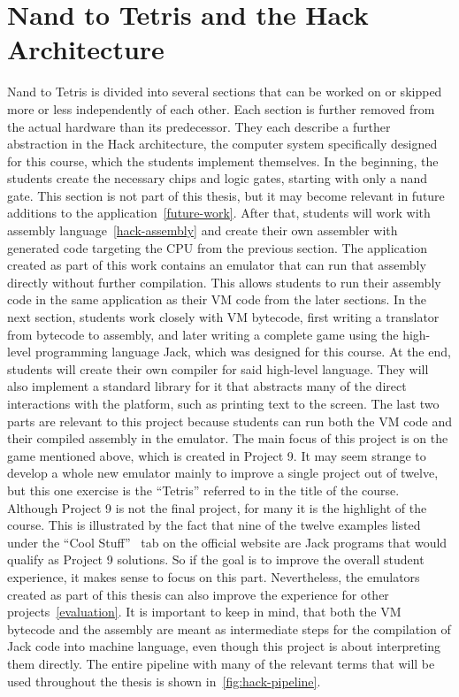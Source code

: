 \section{Nand to Tetris and the Hack Architecture} \label{hack-architecture}
Nand to Tetris is divided into several sections that can be worked on or skipped more or less independently of each other.
Each section is further removed from the actual hardware than its predecessor.
They each describe a further abstraction in the Hack architecture, the computer system specifically designed for this course, which the students implement themselves.
In the beginning, the students create the necessary chips and logic gates, starting with only a nand gate.
This section is not part of this thesis, but it may become relevant in future additions to the application~\ref{future-work}.
After that, students will work with assembly language~\ref{hack-assembly} and create their own assembler with generated code targeting the CPU from the previous section.
The application created as part of this work contains an emulator that can run that assembly directly without further compilation.
This allows students to run their assembly code in the same application as their VM code from the later sections.
In the next section, students work closely with VM bytecode, first writing a translator from bytecode to assembly, and later writing a complete game using the high-level programming language Jack, which was designed for this course.
At the end, students will create their own compiler for said high-level language.
They will also implement a standard library for it that abstracts many of the direct interactions with the platform, such as printing text to the screen.
The last two parts are relevant to this project because students can run both the VM code and their compiled assembly in the emulator.
The main focus of this project is on the game mentioned above, which is created in Project 9.
It may seem strange to develop a whole new emulator mainly to improve a single project out of twelve, but this one exercise is the ``Tetris'' referred to in the title of the course.
Although Project 9 is not the final project, for many it is the highlight of the course.
This is illustrated by the fact that nine of the twelve examples listed under the ``Cool Stuff''~\cite{n2tweb} tab on the official website are Jack programs that would qualify as Project 9 solutions.
So if the goal is to improve the overall student experience, it makes sense to focus on this part.
Nevertheless, the emulators created as part of this thesis can also improve the experience for other projects~\ref{evaluation}.
It is important to keep in mind, that both the VM bytecode and the assembly are meant as intermediate steps for the compilation of Jack code into machine language, even though this project is about interpreting them directly.
The entire pipeline with many of the relevant terms that will be used throughout the thesis is shown in~\cref{fig:hack-pipeline}.


